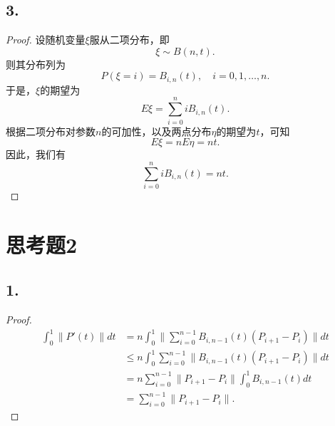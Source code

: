 \documentclass[utf8]{ctexart}
\begin{document}
\subsection*{3.}
\begin{proof}
    设随机变量$\xi$服从二项分布，即
$$
\xi\sim B(n,t).
$$
则其分布列为
$$
P(\xi = i) = B_{i,n}(t),\quad i = 0,1,\dots,n.
$$
于是，$\xi$的期望为
$$
E\xi = \sum_{i=0}^niB_{i,n}(t).
$$
根据二项分布对参数$n$的可加性，以及两点分布$\eta$的期望为$t$，可知
$$
E\xi = nE\eta = nt.
$$
因此，我们有
$$
\sum_{i=0}^niB_{i,n}(t) = nt.
$$
\end{proof}

\section*{思考题2}
\subsection*{1.}
\begin{proof}
    $$
    \begin{aligned}
        \int_0^1\|P'(t)\|dt &= n\int_0^1\|\sum_{i=0}^{n-1}B_{i,n-1}(t)(P_{i+1}-P_i)\|dt\\
        &\leq n\int_0^1\sum_{i=0}^{n-1}\|B_{i,n-1}(t)(P_{i+1}-P_i)\| dt\\
        &= n\sum_{i=0}^{n-1}\|P_{i+1}-P_i\|\int_0^1B_{i,n-1}(t)dt\\
        &= \sum_{i=0}^{n-1}\|P_{i+1}-P_i\|.
    \end{aligned}
    $$
\end{proof}
\end{document}
